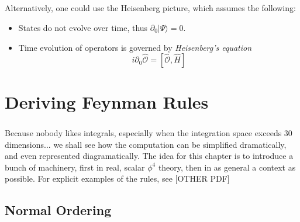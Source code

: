 \documentclass[12pt]{report}
\begin{document}
\paragraph{} Alternatively, one could use the Heisenberg picture, which assumes the following:

	\begin{itemize}
		\item States do not evolve over time, thus $\partial_0 |\Psi\rangle = 0$.
		\item Time evolution of operators is governed by \textit{Heisenberg's equation}
			\begin{equation}
				i \partial_0 \hat{\mathcal{O}} = [\hat{\mathcal{O}},\hat{H}]
			\end{equation}
	\end{itemize}
	


\chapter{Deriving Feynman Rules}

\paragraph{} Because nobody likes integrals, especially when the integration space exceeds 30 dimensions... we shall see how the computation can be simplified dramatically, and even represented diagramatically. The idea for this chapter is to introduce a bunch of machinery, first in real, scalar $\phi^4$ theory, then in as general a context as possible. For explicit examples of the rules, see [OTHER PDF]

\section{Normal Ordering}
\end{document}
